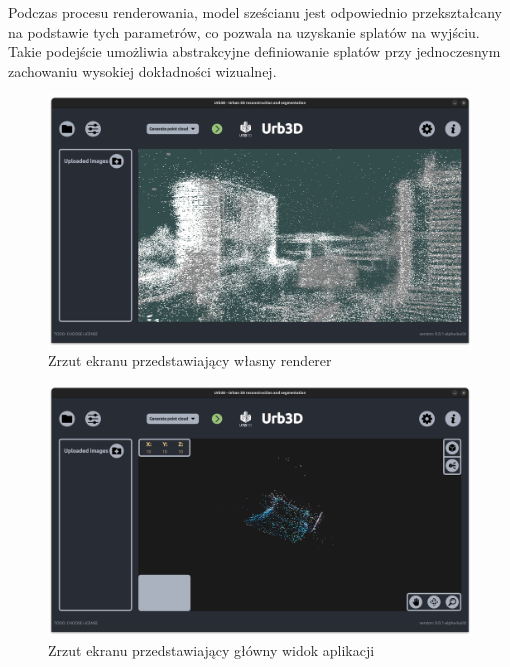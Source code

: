 Podczas procesu renderowania, model sześcianu jest odpowiednio przekształcany na podstawie tych parametrów, co pozwala na uzyskanie splatów na wyjściu. Takie podejście umożliwia abstrakcyjne definiowanie splatów przy jednoczesnym zachowaniu wysokiej dokładności wizualnej.

\begin{figure}[!h]
    \centering
    \includegraphics[width=0.8\linewidth]{images/cloud_rendering.png}
    \caption{Zrzut ekranu przedstawiający własny renderer}
    \label{fig:rendering}
\end{figure}

\begin{figure}[!h]
    \centering
    \includegraphics[width=0.8\linewidth]{images/UI-Rendering.png}
    \caption{Zrzut ekranu przedstawiający główny widok aplikacji}
    \label{fig:ui}
\end{figure}